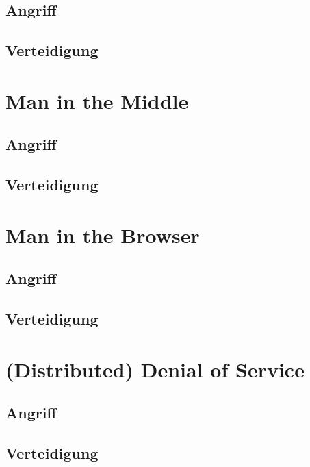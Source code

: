 \subsection*{Angriff}
\blindtext

\subsection*{Verteidigung}
\blindtext


\section{Man in the Middle}
\blindtext

\subsection*{Angriff}
\blindtext

\subsection*{Verteidigung}
\blindtext


\section{Man in the Browser}
\blindtext

\subsection*{Angriff}
\blindtext

\subsection*{Verteidigung}
\blindtext


\section{(Distributed) Denial of Service}
\blindtext

\subsection*{Angriff}
\blindtext

\subsection*{Verteidigung}
\blindtext